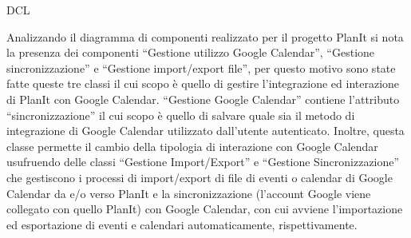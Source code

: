 \begin{listaPersonale}{DCL}
\begin{listaPersonale2}[DCL]{}
        
            \begin{center}
                
            \end{center}
        
            

        Analizzando il diagramma di componenti realizzato per il progetto PlanIt si nota la presenza dei componenti “Gestione utilizzo Google Calendar”, “Gestione sincronizzazione” e “Gestione import/export file”, per questo motivo sono state fatte queste tre classi il cui scopo è quello di gestire l'integrazione ed interazione di PlanIt con Google Calendar. “Gestione Google Calendar” contiene l'attributo “sincronizzazione” il cui scopo è quello di salvare quale sia il metodo di integrazione di Google Calendar utilizzato dall'utente autenticato. Inoltre, questa classe permette il cambio della tipologia di interazione con Google Calendar usufruendo delle classi “Gestione Import/Export” e “Gestione Sincronizzazione” che gestiscono i processi di import/export di file di eventi o calendar di Google Calendar da e/o verso PlanIt e la sincronizzazione (l'account Google viene collegato con quello PlanIt) con Google Calendar, con cui avviene l'importazione ed esportazione di eventi e calendari automaticamente, rispettivamente.
        
        
            \begin{center}
                
            \end{center}
        
            


\end{listaPersonale2}
\end{listaPersonale}
